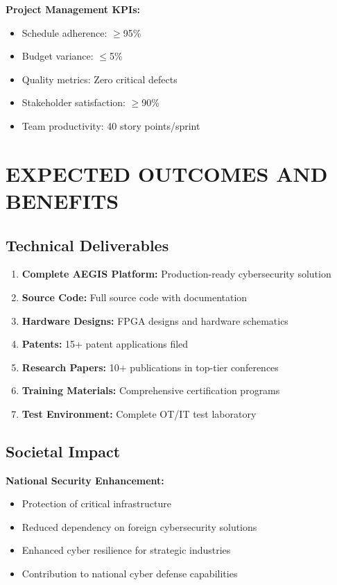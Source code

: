 \documentclass[12pt,a4paper]{article}
\begin{document}
\textbf{Project Management KPIs:}
\begin{itemize}
    \item Schedule adherence: $\geq$95\%
    \item Budget variance: $\leq$5\%
    \item Quality metrics: Zero critical defects
    \item Stakeholder satisfaction: $\geq$90\%
    \item Team productivity: 40 story points/sprint
\end{itemize}

\newpage

\section{EXPECTED OUTCOMES AND BENEFITS}

\subsection{Technical Deliverables}

\begin{enumerate}
    \item \textbf{Complete AEGIS Platform:} Production-ready cybersecurity solution
    \item \textbf{Source Code:} Full source code with documentation
    \item \textbf{Hardware Designs:} FPGA designs and hardware schematics
    \item \textbf{Patents:} 15+ patent applications filed
    \item \textbf{Research Papers:} 10+ publications in top-tier conferences
    \item \textbf{Training Materials:} Comprehensive certification programs
    \item \textbf{Test Environment:} Complete OT/IT test laboratory
\end{enumerate}

\subsection{Societal Impact}

\textbf{National Security Enhancement:}
\begin{itemize}
    \item Protection of critical infrastructure
    \item Reduced dependency on foreign cybersecurity solutions
    \item Enhanced cyber resilience for strategic industries
    \item Contribution to national cyber defense capabilities
\end{itemize}
\end{document}
